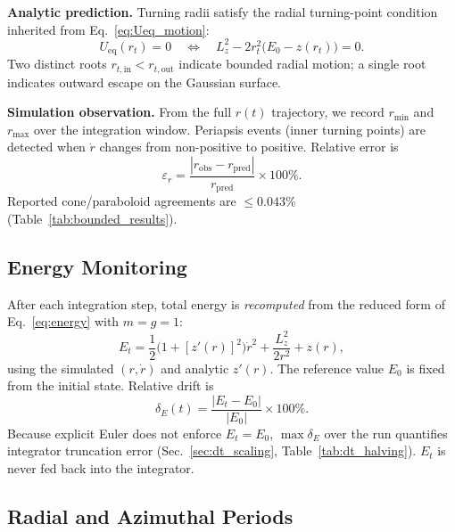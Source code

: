 \documentclass[11pt,letterpaper]{article}
\newcommand{\parhead}[1]{\par\medskip\noindent\textbf{#1}\ignorespaces}
\begin{document}
\parhead{Analytic prediction.}
Turning radii satisfy the radial turning-point condition inherited from Eq.~\eqref{eq:Ueq_motion}:
\begin{equation}\label{eq:turning_analytic}
    U_{\mathrm{eq}}(r_t) = 0
    \quad\Longleftrightarrow\quad
    L_z^2 - 2r_t^2\bigl(E_0 - z(r_t)\bigr) = 0.
\end{equation}
Two distinct roots $r_{t,\mathrm{in}}<r_{t,\mathrm{out}}$ indicate bounded radial motion; a single root indicates outward escape on the Gaussian surface.

\parhead{Simulation observation.}
From the full $r(t)$ trajectory, we record $r_{\min}$ and $r_{\max}$ over the integration window. Periapsis events (inner turning points) are detected when $\dot{r}$ changes from non-positive to positive. Relative error is
\begin{equation}\label{eq:turning_err}
    \varepsilon_r = \frac{|r_{\mathrm{obs}}-r_{\mathrm{pred}}|}{r_{\mathrm{pred}}}\times 100\%.
\end{equation}
Reported cone/paraboloid agreements are $\le 0.043\%$ (Table~\ref{tab:bounded_results}).

\subsection{Energy Monitoring}
\label{sec:analysis_energy}

After each integration step, total energy is \emph{recomputed} from the reduced form of Eq.~\eqref{eq:energy} with $m=g=1$:
\begin{equation}\label{eq:Et_num}
    E_t = \frac{1}{2}\bigl(1+[z'(r)]^2\bigr)\dot{r}^2
        + \frac{L_z^2}{2r^2}
        + z(r),
\end{equation}
using the simulated $(r,\dot{r})$ and analytic $z'(r)$. The reference value $E_0$ is fixed from the initial state. Relative drift is
\begin{equation}\label{eq:deltaE_num}
    \delta_E(t) = \frac{|E_t - E_0|}{|E_0|}\times 100\%.
\end{equation}
Because explicit Euler does not enforce $E_t=E_0$, $\max\delta_E$ over the run quantifies integrator truncation error (Sec.~\ref{sec:dt_scaling}, Table~\ref{tab:dt_halving}). $E_t$ is never fed back into the integrator.

\subsection{Radial and Azimuthal Periods}
\label{sec:analysis_periods}
\end{document}
